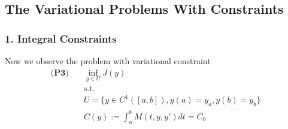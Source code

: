 \documentclass[a4paper,11pt,fleqn]{book}
\theoremstyle{definition}
\theoremstyle{remark}
\begin{document}
\subsection{The Variational Problems With Constraints}
\subsubsection{1. Integral Constraints}
Now we observe the problem with variational constraint
\begin{equation}
\begin{aligned}
\textbf{(P3)}\quad
	& \inf_{y \in U} J(y)\\
	& \text{s.t.}\\
	& U = \{ y \in C^1([a, b]), y(a) = y_a, y(b) = y_b \}\\
	& C(y) := \int_a^b M(t, y, y') dt = C_0
\end{aligned}
\end{equation}
\end{document}
